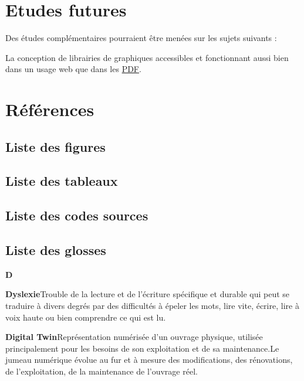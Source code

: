 \documentclass[a4paper,12pt]{article}
\begin{document}
\begin{multicols}{2}
\section{Etudes futures}
\label{sec:org9d90132}
Des études complémentaires pourraient être menées sur les sujets suivants :

La conception de librairies de graphiques accessibles et fonctionnant aussi bien dans un usage web que dans les \protect\hyperlink{gls-19}{\label{gls-19-use-2}PDF}.
\section{Références}
\label{sec:org889b89a}
\subsection{Liste des figures}
\label{sec:org720e9ee}
\renewcommand{\listfigurename}{\vspace{-2em}}
\listoffigures
\subsection{Liste des tableaux}
\label{sec:org0c69bb8}
\renewcommand{\listtablename}{\vspace{-2em}}
\listoftables
\subsection{Liste des codes sources}
\label{sec:org8e032c4}
\renewcommand{\lstlistingname}{\vspace{-2em}}
\listoflistings
\subsection{Liste des glosses}
\label{sec:org291d9d7}
\textbf{D}

\textbf{\hypertarget{gls-17}{Dyslexie}}\hspace*{1em}Trouble de la lecture et de l'écriture spécifique et durable qui peut se traduire à divers degrés par des difficultés à épeler les mots, lire vite, écrire, lire à voix haute ou bien comprendre ce qui est lu.\hspace*{.5em}\pageref{gls-11-use-1}

\textbf{\hypertarget{gls-15}{Digital Twin}}\hspace*{1em}Représentation numérisée d’un ouvrage physique, utilisée principalement pour les besoins de son exploitation et de sa maintenance.Le jumeau numérique évolue au fur et à mesure des modifications, des rénovations, de l’exploitation, de la maintenance de l’ouvrage réel.\hspace*{.5em}\pageref{gls-5-use-1}


\end{multicols}
\end{document}
